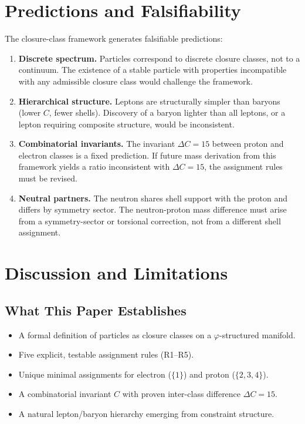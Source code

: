 \documentclass[12pt]{article}
\newcommand{\phig}{\varphi}
\begin{document}
\section{Predictions and Falsifiability}\label{sec:predictions}

The closure-class framework generates falsifiable predictions:

\begin{enumerate}
    \item \textbf{Discrete spectrum.} Particles correspond to discrete closure classes, not to a continuum. The existence of a stable particle with properties incompatible with any admissible closure class would challenge the framework.

    \item \textbf{Hierarchical structure.} Leptons are structurally simpler than baryons (lower $C$, fewer shells). Discovery of a baryon lighter than all leptons, or a lepton requiring composite structure, would be inconsistent.

    \item \textbf{Combinatorial invariants.} The invariant $\Delta C = 15$ between proton and electron classes is a fixed prediction. If future mass derivation from this framework yields a ratio inconsistent with $\Delta C = 15$, the assignment rules must be revised.

    \item \textbf{Neutral partners.} The neutron shares shell support with the proton and differs by symmetry sector. The neutron-proton mass difference must arise from a symmetry-sector or torsional correction, not from a different shell assignment.
\end{enumerate}

\section{Discussion and Limitations}\label{sec:discussion}

\subsection{What This Paper Establishes}

\begin{itemize}
    \item A formal definition of particles as closure classes on a $\phig$-structured manifold.
    \item Five explicit, testable assignment rules (R1--R5).
    \item Unique minimal assignments for electron ($\{1\}$) and proton ($\{2,3,4\}$).
    \item A combinatorial invariant $C$ with proven inter-class difference $\Delta C = 15$.
    \item A natural lepton/baryon hierarchy emerging from constraint structure.
\end{itemize}
\end{document}
